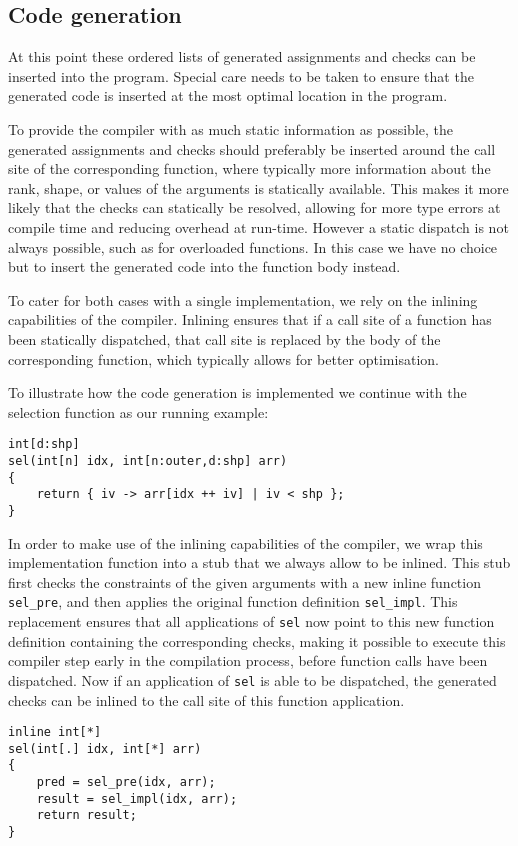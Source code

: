 
\subsection{Code generation}\label{sec:generation}

At this point these ordered lists of generated assignments and checks can be inserted into the program.
Special care needs to be taken to ensure that the generated code is inserted at the most optimal location in the program.

To provide the compiler with as much static information as possible, the generated assignments and checks should preferably be inserted around the call site of the corresponding function, where typically more information about the rank, shape, or values of the arguments is statically available.
This makes it more likely that the checks can statically be resolved, allowing for more type errors at compile time and reducing overhead at run-time.
However a static dispatch is not always possible, such as for overloaded functions.
In this case we have no choice but to insert the generated code into the function body instead.

To cater for both cases with a single implementation, we rely on the inlining capabilities of the compiler.
Inlining ensures that if a call site of a function has been statically dispatched, that call site is replaced by the body of the corresponding function, which typically allows for better optimisation.

To illustrate how the code generation is implemented we continue with the selection function as our running example:
\begin{lstlisting}
int[d:shp]
sel(int[n] idx, int[n:outer,d:shp] arr)
{
    return { iv -> arr[idx ++ iv] | iv < shp };
}
\end{lstlisting}

\noindent
In order to make use of the inlining capabilities of the compiler, we wrap this implementation function into a stub that we always allow to be inlined.
This stub first checks the constraints of the given arguments with a new inline function \texttt{sel\_pre}, and then applies the original function definition \texttt{sel\_impl}.
This replacement ensures that all applications of \texttt{sel} now point to this new function definition containing the corresponding checks, making it possible to execute this compiler step early in the compilation process, before function calls have been dispatched.
Now if an application of \texttt{sel} is able to be dispatched, the generated checks can be inlined to the call site of this function application.
\begin{lstlisting}
inline int[*]
sel(int[.] idx, int[*] arr)
{
    pred = sel_pre(idx, arr);
    result = sel_impl(idx, arr);
    return result;
}
\end{lstlisting}

